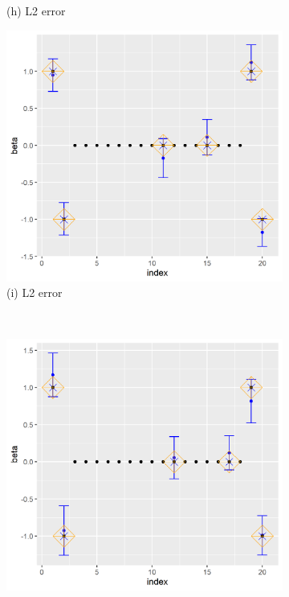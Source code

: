 \begin{figure}[ht!]
\begin{subfigure}[b]{.32\columnwidth}
    \caption{(h) L2 error}
\end{subfigure}
\hfill
\centering
\begin{subfigure}[b]{.32\columnwidth} 
    \includegraphics[width=\columnwidth]{../../plot/p2_50_1_1.png}
    \caption{(i) L2 error}
\end{subfigure}
\\
\centering
\begin{subfigure}[b]{.32\columnwidth} 
    \includegraphics[width=\columnwidth]{../../plot/split_100_1_1.png}

\end{subfigure}
\end{figure}
